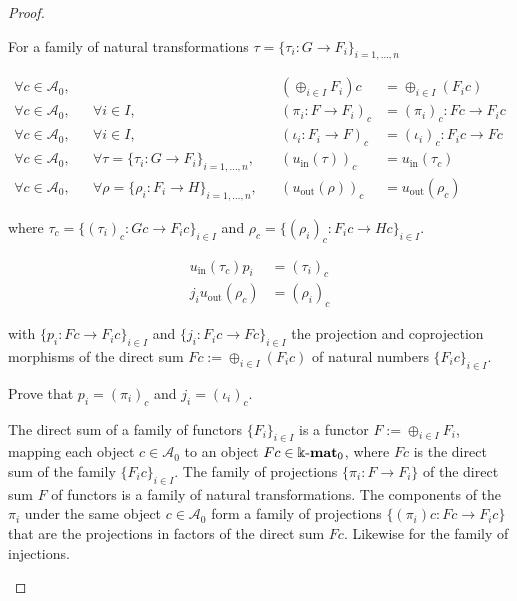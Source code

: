 \begin{proof}
\begin{enumerate}
\begin{subproof}[Proof of (ii)]
For a family of natural transformations $\tau = \{ \tau_{i} : G \rightarrow F_{i} \}_{i = 1,\dots,n}$

\begin{align*}
\forall c \in \mathcal{A}_{0},&& &&  (\oplus_{i \in I} F_{i}) c &= \oplus_{i \in I} (F_{i} c) \\
\forall c \in \mathcal{A}_{0},&& \forall i \in I,&& (\pi_{i} : F \rightarrow F_{i})_{c} &= (\pi_{i})_{c} : Fc \rightarrow F_{i} c \\
\forall c \in \mathcal{A}_{0},&& \forall i \in I,&& (\iota_{i} : F_{i} \rightarrow F)_{c} &= (\iota_{i})_{c} : F_{i} c \rightarrow Fc \\
\forall c \in \mathcal{A}_{0},&& \forall \tau = \{ \tau_{i} : G \rightarrow F_{i} \}_{i = 1,\dots,n},&&
(u_{\mathrm{in}}(\tau))_{c} &= u_{\mathrm{in}}(\tau_{c}) \\
\forall c \in \mathcal{A}_{0},&& \forall \rho = \{ \rho_{i} : F_{i} \rightarrow H \}_{i = 1,\dots,n},&&
(u_{\mathrm{out}}(\rho))_{c} &= u_{\mathrm{out}}(\rho_{c})
\end{align*}

where $\tau_{c} = \{ (\tau_{i})_{c} : Gc \rightarrow F_{i} c \}_{i \in I}$ and $\rho_{c} = \{ (\rho_{i})_{c} : F_{i} c \rightarrow Hc \}_{i \in I}$.

\begin{align*}
u_{\mathrm{in}}(\tau_{c}) p_{i} &= (\tau_{i})_{c} \\
j_{i} u_{\mathrm{out}}(\rho_{c}) &= (\rho_{i})_{c}
\end{align*}

with $\{ p_{i} : Fc \rightarrow F_{i}c \}_{i\in I}$ and $\{ j_{i} : F_{i}c \rightarrow Fc \}_{i \in I}$ the projection and coprojection morphisms
of the direct sum $Fc := \oplus_{i\in I} (F_{i} c)$ of natural numbers $\{F_{i} c \}_{i\in I}$.

Prove that $p_{i} = (\pi_{i})_{c}$ and $j_{i} = (\iota_{i})_{c}$.

The direct sum of a family of functors $\{ F_{i}\}_{i \in I}$ is a functor $F := \oplus_{i \in I} F_{i}$, mapping each object $c \in \mathcal{A}_{0}$
to an object $Fc \in \Bbbk\textnormal{-}\mathbf{mat}_{0}$, where $Fc$ is the direct sum of the family $\{ F_{i}c \}_{i \in I}$.
The family of projections $\{ \pi_{i} : F \rightarrow F_{i} \}$ of the direct sum $F$ of functors is a family of natural transformations.
The components of the $\pi_{i}$ under the same object $c \in \mathcal{A}_{0}$ form a family of projections $\{ (\pi_{i})c : Fc \rightarrow F_{i} c\}$
that are the projections in factors of the direct sum $Fc$. Likewise for the family of injections.


\end{subproof}
\end{enumerate}
\end{proof}
